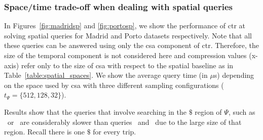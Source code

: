 

	\subsubsection{Space/time trade-off when dealing with spatial queries} \label{sec:exp:temp}

	In Figures~\ref{fig:madridsp} and \ref{fig:portosp}, we show the performance of \gls{ctr} at
	solving spatial queries for Madrid and Porto datasets respectively. 
	Note that all these queries can be answered using only the \gls{csa} component
	of \gls{ctr}. Therefore, the size of the temporal component 
	is not considered here and compression values (x-axis) refer only to the size of \gls{csa} with
	respect to the spatial baseline as in Table~\ref{table:spatial_spaces}. 
	We show the average query time (in $\mu$s) depending on the
	space used by \gls{csa} with three different 
	sampling configurations ($t_{\Psi} =\{512, 128, 32\}$).


	Results show that the queries that involve searching in the $\$$ region of 
	$\Psi$, such as \Sswx\ or \Sfxty\ are considerably slower than queries \Sewx\ and \Sux\ 
	due to the large size of that region. Recall there is one $\$$ for every trip. 



